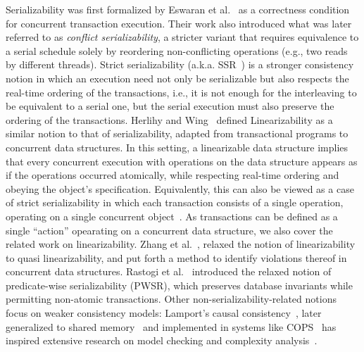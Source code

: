Serializability was first formalized by Eswaran et al.~\cite{EsGrKoTr76} as a 
correctness condition for concurrent transaction execution. 
Their work also introduced what was later referred to as \textit{conflict 
serializability}, a stricter variant that requires equivalence to a serial 
schedule solely by reordering non-conflicting operations (e.g., two reads by 
different threads). 
%
Strict serializability (a.k.a. SSR~\cite{Pa79}) is a stronger consistency 
notion in which an execution need not only be serializable but also respects 
the real-time ordering of the transactions, i.e., it is not enough for the 
interleaving to be equivalent to a serial one, but the serial execution must 
also preserve the ordering of the transactions.
%
%
%
%
Herlihy and Wing~\cite{HeWe87, HeWi90} defined Linearizability as a 
similar notion to that of serializability, adapted from transactional programs 
to concurrent data structures. In this setting, a linearizable data structure 
implies that every concurrent execution 
with operations on the data structure appears as if the operations occurred 
atomically, while respecting real-time ordering and obeying the object's 
specification. 
%
Equivalently, this can also be viewed as a case of strict serializability in 
which each transaction consists of a single operation, operating on a single 
concurrent object~\cite{WaSt06a}.
%
As transactions can be defined as a single ``action'' opearating on a 
concurrent data structure, we also cover the related work on linearizability.
%
Zhang et al.~\cite{ZhChWa13}, relaxed the notion of linearizability to quasi 
linearizability, and put forth a method to identify violations thereof in 
concurrent data structures.
%
Rastogi et al.~\cite{RaMeBrKoSi93} introduced the relaxed notion of 
predicate-wise serializability (PWSR), which preserves database invariants 
while permitting non-atomic transactions.
%
Other non-serializability-related notions focus on weaker consistency models: 
Lamport’s causal 
consistency~\cite{La78}, later generalized to shared memory~\cite{AhNeBuKoHu95} 
and implemented in systems like 
COPS~\cite{LlFrKaAn11} has inspired extensive research on model checking and 
complexity analysis~\cite{BoEnGuHa17,ZeBiBoEnEr19,LaBo20}. 


